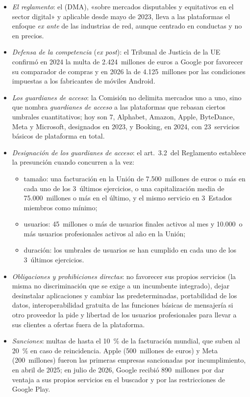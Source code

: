 \documentclass[11pt]{article}
\begin{document}
\begin{itemize}
\item \emph{El reglamento}: el  (DMA), «sobre mercados disputables y equitativos en el sector digital» y aplicable desde mayo de 2023, lleva a las plataformas el enfoque \emph{ex ante} de las industrias de red, aunque centrado en conductas y no en precios\nocite{UE2022DMA}.
\item \emph{Defensa de la competencia} (\emph{ex post}): el Tribunal de Justicia de la UE confirmó en 2024 la multa de 2.424~millones de euros a Google por favorecer su comparador de compras\nocite{TJUE2024GoogleShopping} y en 2026 la de 4.125~millones por las condiciones impuestas a los fabricantes de móviles Android\nocite{TJUE2026GoogleAndroid}.
\item \emph{Los guardianes de acceso}: la Comisión no delimita mercados uno a uno, sino que nombra \emph{guardianes de acceso} a las plataformas que rebasan ciertos umbrales cuantitativos; hoy son 7, Alphabet, Amazon, Apple, ByteDance, Meta y Microsoft, designados en 2023, y Booking, en 2024, con 23~servicios básicos de plataforma en total\nocite{CE2026GuardianesDMA}.
\item \emph{Designación de los guardianes de acceso}: el art.~3.2~del Reglamento\nocite{UE2022DMA} establece la presunción cuando concurren a la vez:
  \begin{itemize}
  \item tamaño: una facturación en la Unión de 7.500~millones de euros o más en cada uno de los 3~últimos ejercicios, o una capitalización media de 75.000~millones o más en el último, y el mismo servicio en 3~Estados miembros como mínimo;
  \item usuarios: 45~millones o más de usuarios finales activos al mes y 10.000~o más usuarios profesionales activos al año en la Unión;
  \item duración: los umbrales de usuarios se han cumplido en cada uno de los 3~últimos ejercicios.
  \end{itemize}
\item \emph{Obligaciones y prohibiciones directas}: no favorecer sus propios servicios (la misma no discriminación que se exige a un incumbente integrado), dejar desinstalar aplicaciones y cambiar las predeterminadas, portabilidad de los datos, interoperabilidad gratuita de las funciones básicas de mensajería si otro proveedor la pide y libertad de los usuarios profesionales para llevar a sus clientes a ofertas fuera de la plataforma\nocite{UE2022DMA}.
\item \emph{Sanciones}: multas de hasta el 10~\% de la facturación mundial, que suben al 20~\% en caso de reincidencia\nocite{UE2022DMA}. Apple (500~millones de euros) y Meta (200~millones) fueron las primeras empresas sancionadas por incumplimiento, en abril de 2025\nocite{CE2025DMAAppleMeta}; en julio de 2026, Google recibió 890~millones por dar ventaja a sus propios servicios en el buscador y por las restricciones de Google Play\nocite{CE2026DMAGoogle}.
\end{itemize}
\end{document}

